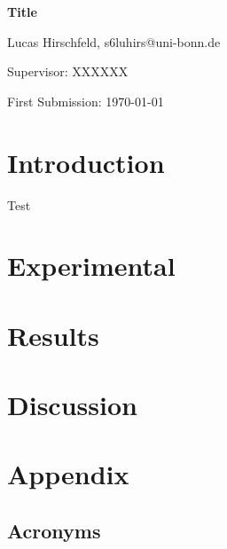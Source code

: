 \documentclass[fontsize=11pt,reqno,a4paper,oneside]{scrartcl}
\makeatletter
\def\Autor{Lucas Hirschfeld, s6luhirs@uni-bonn.de}
\def\Titel{Title}
\def\Date{First Submission: \today}
\def\PiC{Supervisor: XXXXXX}
\def\Abstract{}
\makeatother
\begin{document}
\pagestyle{empty}
\begin{titlepage}
    \begin{center}
        \vspace*{\fill}
        {\LARGE\bfseries \Titel}\par\vspace{2cm}
        {\Autor\par\vspace{0.5cm}\PiC\par\vspace{1cm}\par\vspace{0.2cm}\Date\par\vspace{5cm}}
    \end{center}
    {\Abstract\vspace{0.5cm}\par}\vfill
\end{titlepage}

\pagestyle{scrheadings}
\tableofcontents
{}
\clearpage


\section{Introduction}

Test \cite{AKSokolowski2025}

\clearpage
\section{Experimental}


\clearpage
\section{Results}



\clearpage
\section{Discussion}


\clearpage
\section{Appendix}

\subsection*{Acronyms}

\begin{acronym}

\end{acronym}

\printbibliography[heading=bibintoc, title={References}] 
\end{document}
